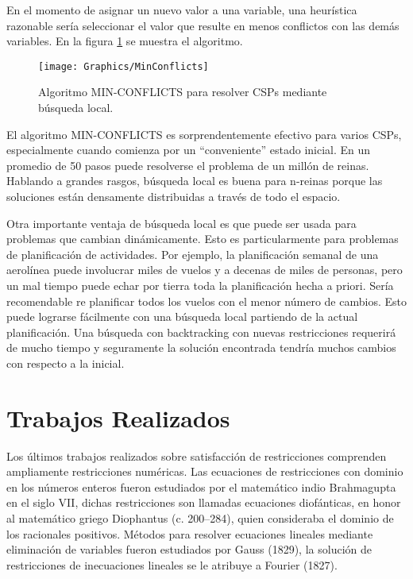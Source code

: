 En el momento de asignar un nuevo valor a una variable, una heur\'istica razonable ser\'ia seleccionar el valor que resulte en menos conflictos con las dem\'as variables. En la figura \ref{MinConflicts} se muestra el algoritmo.

\begin{figure}[h]
	\begin{center}
		\texttt{[image: Graphics/MinConflicts]}
		\caption{Algoritmo MIN-CONFLICTS para resolver CSPs mediante b\'usqueda local.}
		\label{MinConflicts}
	\end{center}	
\end{figure}

El algoritmo MIN-CONFLICTS es sorprendentemente efectivo para varios CSPs, especialmente cuando comienza por un ``conveniente'' estado inicial. En un promedio de 50 pasos puede resolverse el problema de un mill\'on de reinas. Hablando a grandes rasgos, b\'usqueda local es buena para n-reinas porque las soluciones est\'an densamente distribuidas a trav\'es de todo el espacio.

Otra importante ventaja de b\'usqueda local es que puede ser usada para problemas que cambian din\'amicamente. Esto es particularmente para problemas de planificaci\'on de actividades. Por ejemplo, la planificaci\'on semanal de una aerol\'inea puede involucrar miles de vuelos y a decenas de miles de personas, pero un mal tiempo puede echar por tierra toda la planificaci\'on hecha a priori. Ser\'ia recomendable re planificar todos los vuelos con el menor n\'umero de cambios. Esto puede lograrse f\'acilmente con una b\'usqueda local partiendo de la actual planificaci\'on. Una b\'usqueda con backtracking con nuevas restricciones requerir\'a de mucho tiempo y seguramente la soluci\'on encontrada tendr\'ia muchos cambios con respecto a la inicial.

\section{Trabajos Realizados}

Los \'ultimos trabajos realizados sobre satisfacci\'on de restricciones comprenden ampliamente restricciones num\'ericas. Las ecuaciones de restricciones con dominio en los n\'umeros enteros fueron estudiados por el matem\'atico indio Brahmagupta en el siglo VII, dichas restricciones son llamadas ecuaciones diofánticas, en honor al matem\'atico griego Diophantus (c. 200–284), quien consideraba el dominio de los racionales positivos. M\'etodos para resolver ecuaciones lineales  mediante eliminaci\'on de variables fueron estudiados por Gauss (1829), la soluci\'on de restricciones de inecuaciones lineales se le atribuye a Fourier (1827).

